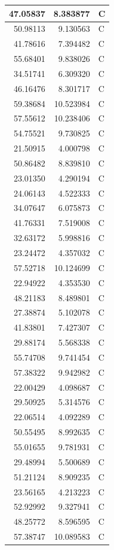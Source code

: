 \documentclass[
  letterpaper,
  DIV=11,
  numbers=noendperiod]{scrartcl}
\begin{document}
\begin{table}
\begin{tabular}[t]{r|r|l}
\hline
47.05837 & 8.383877 & C\\
\hline
50.98113 & 9.130563 & C\\
\hline
41.78616 & 7.394482 & C\\
\hline
55.68401 & 9.838026 & C\\
\hline
34.51741 & 6.309320 & C\\
\hline
46.16476 & 8.301717 & C\\
\hline
59.38684 & 10.523984 & C\\
\hline
57.55612 & 10.238406 & C\\
\hline
54.75521 & 9.730825 & C\\
\hline
21.50915 & 4.000798 & C\\
\hline
50.86482 & 8.839810 & C\\
\hline
23.01350 & 4.290194 & C\\
\hline
24.06143 & 4.522333 & C\\
\hline
34.07647 & 6.075873 & C\\
\hline
41.76331 & 7.519008 & C\\
\hline
32.63172 & 5.998816 & C\\
\hline
23.24472 & 4.357032 & C\\
\hline
57.52718 & 10.124699 & C\\
\hline
22.94922 & 4.353530 & C\\
\hline
48.21183 & 8.489801 & C\\
\hline
27.38874 & 5.102078 & C\\
\hline
41.83801 & 7.427307 & C\\
\hline
29.88174 & 5.568338 & C\\
\hline
55.74708 & 9.741454 & C\\
\hline
57.38322 & 9.942982 & C\\
\hline
22.00429 & 4.098687 & C\\
\hline
29.50925 & 5.314576 & C\\
\hline
22.06514 & 4.092289 & C\\
\hline
50.55495 & 8.992635 & C\\
\hline
55.01655 & 9.781931 & C\\
\hline
29.48994 & 5.500689 & C\\
\hline
51.21124 & 8.909235 & C\\
\hline
23.56165 & 4.213223 & C\\
\hline
52.92992 & 9.327941 & C\\
\hline
48.25772 & 8.596595 & C\\
\hline
57.38747 & 10.089583 & C\\

\end{tabular}
\end{table}
\end{document}
